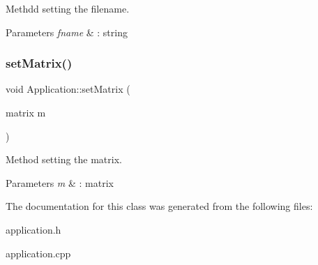 Methdd setting the filename. 
\begin{DoxyParams}{Parameters}
{\em fname} & \+: string \\
\hline
\end{DoxyParams}
\mbox{\label{class_application_a56b4a55e9eabd40b7f0033ba39631ebe}} 
\subsubsection{\texorpdfstring{set\+Matrix()}{setMatrix()}}
{\footnotesize\ttfamily void Application\+::set\+Matrix (\begin{DoxyParamCaption}\item[{matrix}]{m }\end{DoxyParamCaption})}

Method setting the matrix. 
\begin{DoxyParams}{Parameters}
{\em m} & \+: matrix \\
\hline
\end{DoxyParams}


The documentation for this class was generated from the following files\+:\begin{DoxyCompactItemize}
\item 
application.\+h\item 
application.\+cpp\end{DoxyCompactItemize}
